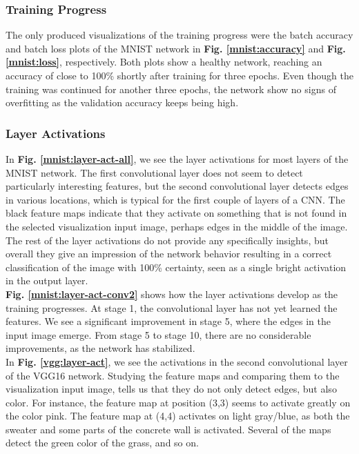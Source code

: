 
\subsubsection{Training Progress}

The only produced visualizations of the training progress were the batch accuracy and batch loss plots of the MNIST network in \textbf{Fig. \ref{mnist:accuracy}} and \textbf{Fig. \ref{mnist:loss}}, respectively. Both plots show a healthy network, reaching an accuracy of close to 100\% shortly after training for three epochs. Even though the training was continued for another three epochs, the network show no signs of overfitting as the validation accuracy keeps being high. 


\subsubsection{Layer Activations}

In \textbf{Fig. \ref{mnist:layer-act-all}}, we see the layer activations for most layers of the MNIST network. The first convolutional layer does not seem to detect particularly interesting features, but the second convolutional layer detects edges in various locations, which is typical for the first couple of layers of a CNN. The black feature maps indicate that they activate on something that is not found in the selected visualization input image, perhaps edges in the middle of the image. The rest of the layer activations do not provide any specifically insights, but overall they give an impression of the network behavior resulting in a correct classification of the image with 100\% certainty, seen as a single bright activation in the output layer. \\

\noindent \textbf{Fig. \ref{mnist:layer-act-conv2}} shows how the layer activations develop as the training progresses. At stage 1, the convolutional layer has not yet learned the features. We see a significant improvement in stage 5, where the edges in the input image emerge. From stage 5 to stage 10, there are no considerable improvements, as the network has stabilized. \\

\noindent In \textbf{Fig. \ref{vgg:layer-act}}, we see the activations in the second convolutional layer of the VGG16 network. Studying the feature maps and comparing them to the visualization input image, tells us that they do not only detect edges, but also color. For instance, the feature map at position (3,3) seems to activate greatly on the color pink. The feature map at (4,4) activates on light gray/blue, as both the sweater and some parts of the concrete wall is activated. Several of the maps detect the green color of the grass, and so on. 

